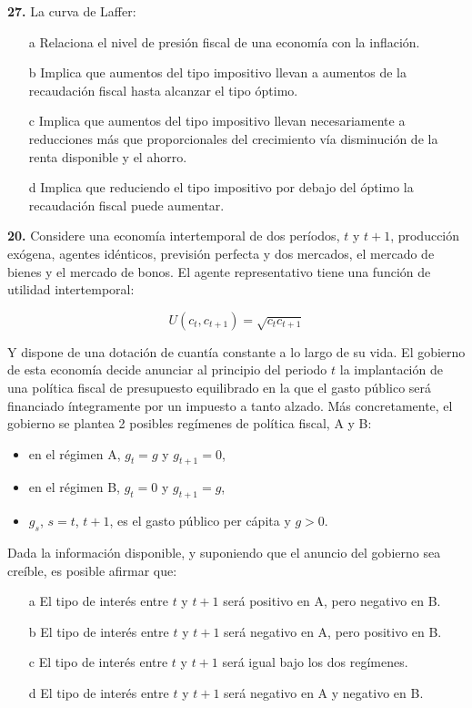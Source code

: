 \documentclass{nuevotema}
\begin{document}
\textbf{27.} La curva de Laffer:
\begin{itemize}
	\item[a] Relaciona el nivel de presión fiscal de una economía con la inflación.
	\item[b] Implica que aumentos del tipo impositivo llevan a aumentos de la recaudación fiscal hasta alcanzar el tipo óptimo.
	\item[c] Implica que aumentos del tipo impositivo llevan necesariamente a reducciones más que proporcionales del crecimiento vía disminución de la renta disponible y el ahorro.
	\item[d] Implica que reduciendo el tipo impositivo por debajo del óptimo la recaudación fiscal puede aumentar.
\end{itemize}

\textbf{20.} Considere una economía intertemporal de dos períodos, $t$ y $t+1$, producción exógena, agentes idénticos, previsión perfecta y dos mercados, el mercado de bienes y el mercado de bonos. El agente representativo tiene una función de utilidad intertemporal:

\begin{equation*}
U(c_t, c_{t+1}) = \sqrt{c_t c_{t+1}}
\end{equation*}

Y dispone de una dotación de cuantía constante a lo largo de su vida. El gobierno de esta economía decide anunciar al principio del periodo $t$ la implantación de una política fiscal de presupuesto equilibrado en la que el gasto público será financiado íntegramente por un impuesto a tanto alzado. Más concretamente, el gobierno se plantea 2 posibles regímenes de política fiscal, A y B:

\begin{itemize}
	\item en el régimen A, $g_t = g$ y $g_{t+1} = 0$,
	\item en el régimen B, $g_t = 0$ y $g_{t+1} = g$,
	\item $g_s$, $s=t$, $t+1$, es el gasto público per cápita y $g>0$.
\end{itemize}

Dada la información disponible, y suponiendo que el anuncio del gobierno sea creíble, es posible afirmar que:

\begin{itemize}
	\item[a] El tipo de interés entre $t$ y $t+1$ será positivo en A, pero negativo en B.
	\item[b] El tipo de interés entre $t$ y $t+1$ será negativo en A, pero positivo en B.
	\item[c] El tipo de interés entre $t$ y $t+1$ será igual bajo los dos regímenes.
	\item[d] El tipo de interés entre $t$ y $t+1$ será negativo en A y negativo en B.
\end{itemize}
\end{document}
